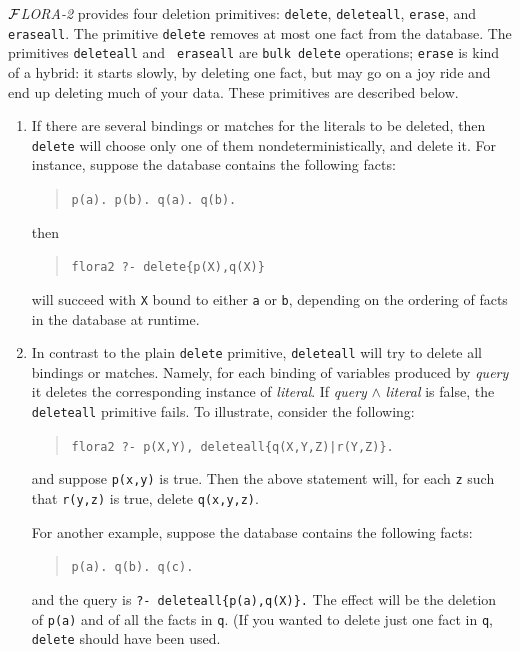 \documentclass[11pt]{article}
\newcommand{\FLORA}{{\mbox{${\cal F}${\small\it LORA}\rm\emph{-2}}}\xspace}
\begin{document}
\FLORA provides four deletion primitives: {\tt delete}, {\tt deleteall},
{\tt erase}, and {\tt eraseall}. The primitive {\tt delete} removes at most
one fact from the database. The primitives {\tt deleteall} and {\tt
  eraseall} are {\tt bulk delete} operations; {\tt erase} is kind of a
hybrid: it starts slowly, by deleting one fact, but may go on a joy ride
and end up deleting much of your data. These primitives are described
below.
\begin{enumerate}
\item If there are several bindings or matches for the literals to be
  deleted, then {\tt delete} will choose only one of them
  nondeterministically, and delete it.  For instance, suppose the database
  contains the following facts:
  \begin{quote}
    \verb|p(a). p(b). q(a). q(b).|
  \end{quote}
  then
  \begin{quote}
    \verb|flora2 ?- delete{p(X),q(X)}|
  \end{quote}
  will succeed with {\tt X} bound to either {\tt a} or {\tt b},
  depending on the ordering of facts in the database at runtime.
      
\item In contrast to the plain {\tt delete} primitive, {\tt deleteall} will
  try to delete all bindings or matches.  Namely, for each binding of
  variables produced by \emph{query} it deletes the corresponding instance
  of \emph{literal}. If \emph{query} $\wedge$ \emph{literal} is false, the
  {\tt deleteall} primitive fails.  To illustrate, consider the following:
  \begin{quote}
    {\tt flora2 ?- p(X,Y), deleteall\{q(X,Y,Z)|r(Y,Z)\}.}
  \end{quote}
  and suppose {\tt p(x,y)} is true. Then the above statement will, for
  each {\tt z} such that {\tt r(y,z)} is true,
  delete {\tt q(x,y,z)}.
  
  For another example, suppose the database contains the following facts:
  \begin{quote}
    \verb|p(a). q(b). q(c).|
  \end{quote}
  and the query is {\tt ?- deleteall\{p(a),q(X)\}.} The effect will be 
  the deletion of {\tt p(a)} and of all the facts in {\tt q}. (If you
  wanted to delete just one fact in {\tt q}, {\tt delete} should
  have been used.
  
  \smallskip
  

\end{enumerate}
\end{document}
